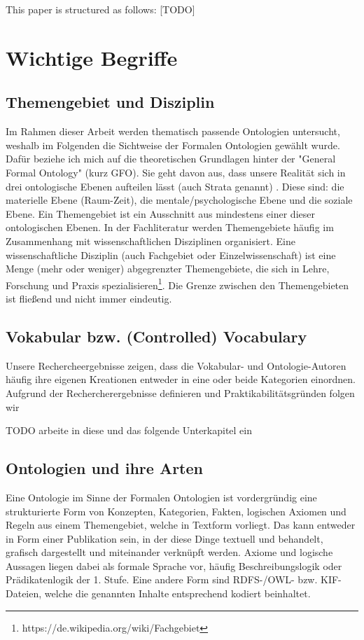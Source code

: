 \documentclass{article}
\begin{document}
This paper is structured as follows: [TODO]


\section{Wichtige Begriffe}

\subsection{Themengebiet und Disziplin}

Im Rahmen dieser Arbeit werden thematisch passende Ontologien untersucht, weshalb im Folgenden die Sichtweise der Formalen Ontologien gewählt wurde. Dafür beziehe ich mich auf die theoretischen Grundlagen hinter der "General Formal Ontology" (kurz GFO). Sie geht davon aus, dass unsere Realität sich in drei ontologische Ebenen aufteilen lässt (auch Strata genannt) \cite{herre2006general}. Diese sind: die materielle Ebene (Raum-Zeit), die mentale/psychologische Ebene und die soziale Ebene. Ein Themengebiet ist ein Ausschnitt aus mindestens einer dieser ontologischen Ebenen.
In der Fachliteratur werden Themengebiete häufig im Zusammenhang mit wissenschaftlichen Disziplinen organisiert. Eine wissenschaftliche Disziplin (auch Fachgebiet oder Einzelwissenschaft) ist eine Menge (mehr oder weniger) abgegrenzter Themengebiete, die sich in Lehre, Forschung und Praxis spezialisieren\footnote{https://de.wikipedia.org/wiki/Fachgebiet}. Die Grenze zwischen den Themengebieten ist fließend und nicht immer eindeutig.


\subsection{Vokabular bzw. (Controlled) Vocabulary}

Unsere Rechercheergebnisse zeigen, dass die Vokabular- und Ontologie-Autoren häufig ihre eigenen Kreationen entweder in eine oder beide Kategorien einordnen.
Aufgrund der Rechercherergebnisse definieren und Praktikabilitätsgründen folgen wir

TODO arbeite \cite{neuhaus2018ontology} in diese und das folgende Unterkapitel ein


\subsection{Ontologien und ihre Arten}

Eine Ontologie im Sinne der Formalen Ontologien ist vordergründig eine strukturierte Form von Konzepten, Kategorien, Fakten, logischen Axiomen und Regeln aus einem Themengebiet, welche in Textform vorliegt. Das kann entweder in Form einer Publikation sein, in der diese Dinge textuell und behandelt, grafisch dargestellt und miteinander verknüpft werden. Axiome und logische Aussagen liegen dabei als formale Sprache vor, häufig Beschreibungslogik oder Prädikatenlogik der 1. Stufe. Eine andere Form sind RDFS-/OWL- bzw. KIF-Dateien, welche die genannten Inhalte entsprechend kodiert beinhaltet.
\end{document}
